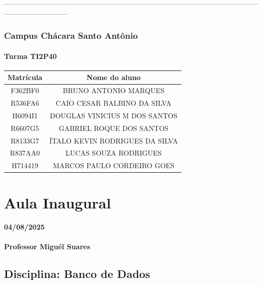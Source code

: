 \documentclass[
]{book}
\begin{document}
---------------------------------------------------------------------------------------------------------------------------------------

\subsection{Campus Chácara Santo Antônio}\label{campus-chuxe1cara-santo-antuxf4nio}

\subsubsection{Turma TI2P40}\label{turma-ti2p40}

\begin{longtable}[]{@{}cc@{}}
\toprule\noalign{}
Matrícula & Nome do aluno \\
\midrule\noalign{}
\endhead
\bottomrule\noalign{}
\endlastfoot
F362BF0 & BRUNO ANTONIO MARQUES \\
R536FA6 & CAIO CESAR BALBINO DA SILVA \\
H6094I1 & DOUGLAS VINICIUS M DOS SANTOS \\
R6607G5 & GABRIEL ROQUE DOS SANTOS \\
R8133G7 & ÍTALO KEVIN RODRIGUES DA SILVA \\
R837AA0 & LUCAS SOUZA RODRIGUES \\
H714419 & MARCOS PAULO CORDEIRO GOES \\
\end{longtable}

\chapter{Aula Inaugural}\label{aula-inaugural}

\subsubsection*{04/08/2025}\label{section}

\subsubsection*{Professor Miguél Suares}\label{professor-miguuxe9l-suares}

\section{\texorpdfstring{Disciplina: \textbf{Banco de Dados}}{Disciplina: Banco de Dados}}\label{disciplina-banco-de-dados}
\end{document}
